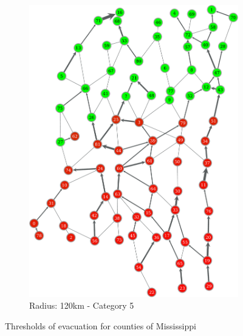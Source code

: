 \documentclass[titlepage]{article}
\begin{document}
\begin{figure}
\begin{subfigure}[b]{0.3\textwidth}
        \includegraphics[width=\textwidth]{figures/right_120_5-crop.pdf}
        \caption{Radius: 120km - Category 5}
        \label{fig:pop_county60}
      \end{subfigure}
      \caption{Thresholds of evacuation for counties of Mississippi}
      \label{fig:thresholds}
    \end{figure}
\end{document}
